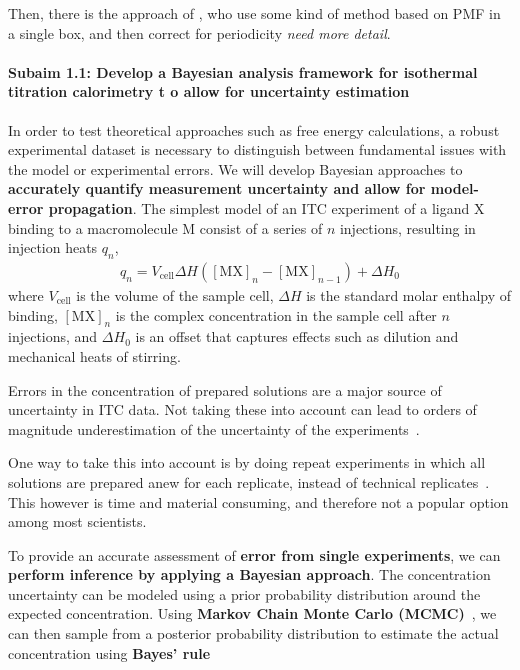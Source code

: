 \documentclass[10pt,final]{article}
\newcommand{\subsubsubsection}[1]{\paragraph*{#1}}
\begin{document}
Then, there is the approach of \textcite{Lin2014a}, who use some kind of method based on PMF in a single box, and then correct for periodicity \emph{need more detail}. 


\subsubsubsection{Subaim 1.1: Develop a Bayesian analysis framework for isothermal titration calorimetry t	o allow for uncertainty estimation}
In order to test theoretical approaches such as free energy calculations, a robust experimental dataset is necessary to distinguish between fundamental issues with the model or experimental errors. 
We will develop Bayesian approaches to \textbf{accurately quantify measurement uncertainty and allow for model-error propagation}. 
The simplest model of an ITC experiment of a ligand $\mathrm{X}$ binding to a macromolecule $\mathrm{M}$ consist of a series of $n$ injections, resulting in injection heats $q_n$,
\begin{align}
	q_n = V_\mathrm{cell} \Delta H \left( [\mathrm{MX}]_n - [\mathrm{MX}]_{n-1} \right) + \Delta H_0 \label{equation:liberated-heat}
\end{align}
where $V_\mathrm{cell}$ is the volume of the sample cell, $\Delta H$ is the standard molar enthalpy of binding, $[\mathrm{MX}]_n$ is the complex concentration in the sample cell after $n$ injections, and $\Delta H_0$ is an offset that captures effects such as dilution and mechanical heats of stirring.


Errors in the concentration of prepared solutions are a major source of uncertainty in ITC data. Not taking these into account can lead to orders of magnitude underestimation of the uncertainty of the experiments~\cite{Myszka2003a,Tellinghuisen2011a}.

One way to take this into account is by doing repeat experiments in which all solutions are prepared anew for each replicate, instead of technical replicates~\cite{Vaux2012a}. This however is time and material consuming, and therefore not a popular option among most scientists. 

To provide an accurate assessment of \textbf{error from single experiments}, we can \textbf{perform inference by applying a Bayesian approach}. The concentration uncertainty can be modeled using a prior probability distribution around the expected concentration. Using \textbf{Markov Chain Monte Carlo (MCMC)}~\cite{Metropolis1953a,Hastings1970a}, we can then sample from a posterior probability distribution to estimate the actual concentration using\textbf{ Bayes' rule}
\end{document}
